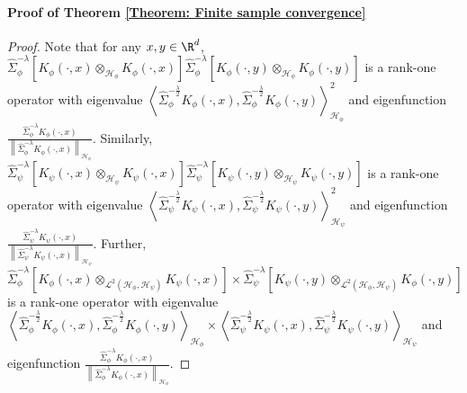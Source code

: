 \documentclass{article} %
\newcommand{\HS}{\mathcal{L}^{2}}
\newcommand{\repone}{\phi}
\newcommand{\reptwo}{\psi}
\newcommand{\Hone}{\mathcal{H}_{\phi}}
\newcommand{\Htwo}{\mathcal{H}_{\psi}}
\newcommand{\norm}[1]{\left\|#1\right\|}
\newcommand{\inprod}[1]{\left \langle #1 \right\rangle}
\theoremstyle{plain}
\begin{document}
\paragraph{Proof of Theorem \ref{Theorem: Finite sample convergence}}\label{Proof of Theorem 2}

\begin{proof}
    Note that for any $x,y \in \R^{d}$, $\hat{\Sigma}_{\repone}^{-\lambda}\left[K_{\repone}(\cdot,x)\otimes_{\Hone}K_{\repone}(\cdot,x)\right]\hat{\Sigma}_{\repone}^{-\lambda}\left[K_{\repone}(\cdot,y)\otimes_{\Hone}K_{\repone}(\cdot,y)\right]$ is a rank-one operator with eigenvalue $\inprod{\hat{\Sigma}_{\repone}^{-\frac{\lambda}{2}}K_{\repone}(\cdot,x),\hat{\Sigma}_{\repone}^{-\frac{\lambda}{2}}K_{\repone}(\cdot,y)}_{\Hone}^{2}$ and eigenfunction $\frac{\hat{\Sigma}_{\repone}^{-\lambda}K_{\repone}(\cdot,x)}{\norm{\hat{\Sigma}_{\repone}^{-\lambda}K_{\repone}(\cdot,x)}_{\Hone}}$. Similarly, $\hat{\Sigma}_{\reptwo}^{-\lambda}\left[K_{\reptwo}(\cdot,x)\otimes_{\Htwo}K_{\reptwo}(\cdot,x)\right]\hat{\Sigma}_{\reptwo}^{-\lambda}\left[K_{\reptwo}(\cdot,y)\otimes_{\Htwo}K_{\reptwo}(\cdot,y)\right]$ is a rank-one operator with eigenvalue $\inprod{\hat{\Sigma}_{\reptwo}^{-\frac{\lambda}{2}}K_{\reptwo}(\cdot,x),\hat{\Sigma}_{\reptwo}^{-\frac{\lambda}{2}}K_{\reptwo}(\cdot,y)}_{\Htwo}^{2}$ and eigenfunction $\frac{\hat{\Sigma}_{\reptwo}^{-\lambda}K_{\reptwo}(\cdot,x)}{\norm{\hat{\Sigma}_{\reptwo}^{-\lambda}K_{\reptwo}(\cdot,x)}_{\Htwo}}$. Further, \\$\hat{\Sigma}_{\repone}^{-\lambda}\left[K_{\repone}(\cdot,x)\otimes_{\HS(\Hone,\Htwo)}K_{\reptwo}(\cdot,x)\right] \times\hat{\Sigma}_{\reptwo}^{-\lambda}\left[K_{\reptwo}(\cdot,y)\otimes_{\HS(\Hone,\Htwo)}K_{\repone}(\cdot,y)\right]$ is a rank-one operator with eigenvalue $\inprod{\hat{\Sigma}_{\repone}^{-\frac{\lambda}{2}}K_{\repone}(\cdot,x),\hat{\Sigma}_{\repone}^{-\frac{\lambda}{2}}K_{\repone}(\cdot,y)}_{\Hone}\times\inprod{\hat{\Sigma}_{\reptwo}^{-\frac{\lambda}{2}}K_{\reptwo}(\cdot,x),\hat{\Sigma}_{\reptwo}^{-\frac{\lambda}{2}}K_{\reptwo}(\cdot,y)}_{\Htwo}$ and eigenfunction $\frac{\hat{\Sigma}_{\repone}^{-\lambda}K_{\repone}(\cdot,x)}{\norm{\hat{\Sigma}_{\repone}^{-\lambda}K_{\repone}(\cdot,x)}_{\Hone}}$.


\end{proof}
\end{document}
